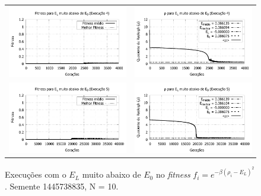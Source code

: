 \begin{figure}[p]
\begin{tabular}{@{}cc@{}}
		\includegraphics[width=.40\textwidth]{figs/resultados/variandoEL/T4E4_fitness-extendido.pdf} &
    \includegraphics[width=.40\textwidth]{figs/resultados/variandoEL/T4E4_rho_extendido.pdf}   \\
		
		\includegraphics[width=.40\textwidth]{figs/resultados/variandoEL/T4E5_fitness-extendido.pdf} &
    \includegraphics[width=.40\textwidth]{figs/resultados/variandoEL/T4E5_rho_extendido.pdf}
		
  \end{tabular}
  \caption{Execuções com o $E_L$ muito abaixo de $E_0$ no \textit{fitness} $f_i = e^{-\beta(\rho_i - E_L)^2}$. Semente 1445738835, N = 10.}
	\label{fig:variando_EL_muito_abaixo}
	\end{figure}
	
